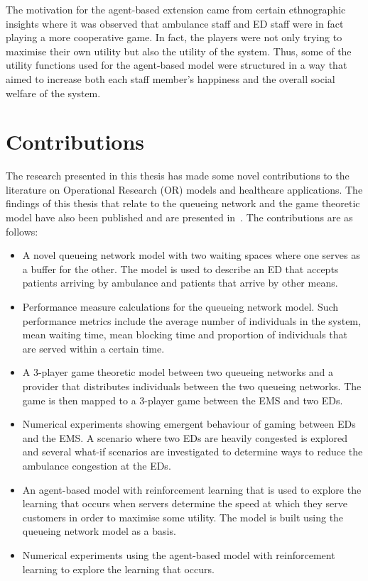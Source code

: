 The motivation for the agent-based extension came from certain ethnographic
insights where it was observed that ambulance staff and ED staff were in fact
playing a more cooperative game.
In fact, the players were not only trying to maximise their own utility but
also the utility of the system.
Thus, some of the utility functions used for the agent-based model were
structured in a way that aimed to increase both each staff member's happiness
and the overall social welfare of the system.



\section{Contributions}

The research presented in this thesis has made some novel contributions to the
literature on Operational Research (OR) models and healthcare applications.
The findings of this thesis that relate to the queueing network and the game
theoretic model have also been published and are presented
in~\cite{panayides2023game}.
The contributions are as follows:

\begin{itemize}
    \item A novel queueing network model with two waiting spaces where one
    serves as a buffer for the other.
    The model is used to describe an ED that accepts patients arriving by
    ambulance and patients that arrive by other means.
    \item Performance measure calculations for the queueing network model.
    Such performance metrics include the average number of individuals in the
    system, mean waiting time, mean blocking time and proportion of individuals
    that are served within a certain time.
    \item A 3-player game theoretic model between two queueing networks and a
    provider that distributes individuals between the two queueing networks.
    The game is then mapped to a 3-player game between the EMS and two EDs.
    \item Numerical experiments showing emergent behaviour of gaming between
    EDs and the EMS.
    A scenario where two EDs are heavily congested is explored and several
    what-if scenarios are investigated to determine ways to reduce the
    ambulance congestion at the EDs.
    \item An agent-based model with reinforcement learning that is used to
    explore the learning that occurs when servers determine the speed at which
    they serve customers in order to maximise some utility.
    The model is built using the queueing network model as a basis.
    \item Numerical experiments using the agent-based model with reinforcement
    learning to explore the learning that occurs.
\end{itemize}

